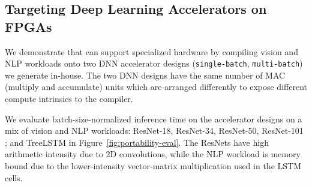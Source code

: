\subsection*{Targeting Deep Learning Accelerators on FPGAs}
We demonstrate that \relay can support specialized hardware by compiling vision and
NLP workloads onto two DNN accelerator designs (\texttt{single-batch}, \texttt{multi-batch}) we generate in-house.
%
%
%
The two DNN designs have the same number of MAC (multiply and accumulate) units which are
arranged differently to expose different compute intrinsics to the compiler.
%
%

We evaluate batch-size-normalized inference time on the accelerator designs
  on a mix of vision and NLP workloads:
  ResNet-18, ResNet-34, ResNet-50, ResNet-101 \cite{resnet};
  and TreeLSTM in Figure~\ref{fig:portability-eval}.
The ResNets have high arithmetic intensity
due to 2D convolutions, while the NLP workload is memory bound due to the lower-intensity vector-matrix
multiplication used in the LSTM cells.

